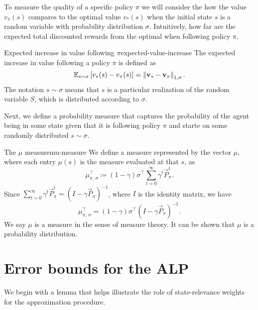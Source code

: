 To measure the quality of a specific policy $\pi$ we will consider the how the
value $v_\pi(s)$ compares to the optimal value $v_* (s)$ when the initial state
$s$ is a random variable with probability distribution $\sigma$. Intuitively,
how far are the expected total discounted rewards from the optimal when
following policy $\pi$.

\begin{dfn}{Expected increase in value following $\pi$}{expected-value-increase}
    The expected increase in value following a policy $\pi$ is defined as
    \begin{equation}
        \label{eq:expected-value-increase}
        \mathbb{E}_{s \sim \sigma} \left[ v_* (s) - v_\pi (s) \right] = \left\| \mathbf{v
        }_* - \mathbf{v}_\pi \right\|_{1, \sigma}.
    \end{equation}
    The notation $s \sim \sigma$ means that $s$ is a particular realization of the
    random variable $S$, which is distributed according to $\sigma$.
\end{dfn}

Next, we define a probability measure that captures the probability of the agent
being in some state given that it is following policy $\pi$ and starte on some
randomly distributed $s \sim \sigma$.

\begin{dfn}{The $\mu$ measure}{mu-measure}
    We define a measure represented by the vector $\mu$, where each entry
    $\mu(s)$ is the measure evaluated at that $s$, as
    \[
        \mu_{\pi, \, \sigma}^{\top} \coloneqq (1 - \gamma) \sigma^{\top} \sum_{t=0}^{\infty} \gamma^{t} \vec{P}_{\pi}^{t}.
    \]
    Since $\sum_{t=0}^{\infty} \gamma^{t} \vec{P}_{\pi}^{t} = (I - \gamma
    \vec{P}_\pi)^{-1}$, where $I$ is the identity matrix, we have
    \[
        \mu_{\pi, \, \sigma}^{\top} = (1 - \gamma) \sigma^{\top} (I - \gamma \vec{P}_{\pi})^{-1}.
    \]
    We say $\mu$ is a measure in the sense of measure theory. It can be shown
    \Cite[pg.~864]{farias2003LP2ADP} that $\mu$ is a probability distribution.
\end{dfn}

\section{Error bounds for the ALP}

We begin with a lemma that helps illustrate the role of state-relevance weights
for the approximation procedure.


